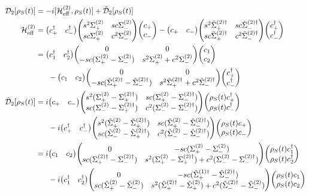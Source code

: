 \documentclass[dvipdfmx,autodetect-engine]{jsarticle}
\newcommand{\da}{\dagger}
\newcommand{\m}[1]{\mathcal{#1}}
\newcommand{\mr}[1]{\mathrm{#1}}
\begin{document}
\begin{align}
    \m{D}_2[\rho_S(t)] &= -i[\m{H}^{(2)}_{\mr{eff}}, \rho_S(t)] + \tilde{\m{D}}_2[\rho_S(t)]\\
    \m{H}^{(2)}_{\mr{eff}} &= \mqty(c^\da_+ & c^\da_-) \mqty(s^2 \Sigma^{(2)}_+ & sc \Sigma^{(2)}_- \\ sc \Sigma^{(2)}_+ & c^2 \Sigma^{(2)}_-)\mqty(c_+ \\ c_-) - \mqty(c_+ & c_-) \mqty(s^2 \tilde{\Sigma}^{(2)\da}_+ & sc \tilde{\Sigma}^{(2)\da}_- \\ sc \tilde{\Sigma}^{(2)\da}_+ & c^2 \tilde{\Sigma}^{(2)\da}_-)\mqty(c^\da_+ \\ c^\da_-)\nonumber\\
    &= \mqty(c^\da_1 & c^\da_2)\mqty(0 & 0\\ -sc(\Sigma^{(2)}_+-\Sigma^{(2)}_- ) & s^2 \Sigma^{(2)}_+ + c^2 \Sigma^{(2)}_- )\mqty(c_1 \\ c_2)\nonumber\\
    & \ \ \ \ \  - \mqty(c_1 & c_2)\mqty(0 & 0 \\ -sc( \tilde{\Sigma}^{(2)\da}_+- \tilde{\Sigma}^{(2)\da}_-) & s^2 \tilde{\Sigma}^{(2)\da}_++c^2 \tilde{\Sigma}^{(2)\da}_-)\mqty(c^\da_+ \\ c^\da_-)\\
    \tilde{\m{D}}_2[\rho_S(t)] &= i\mqty(c_+ & c_-) \mqty(s^2(\Sigma^{(2)}_+-\Sigma^{(2)\da}_+) & sc(\Sigma^{(2)}_+-\Sigma^{(2)\da}_-) \\ sc(\Sigma^{(2)}_--\Sigma^{(2)\da}_+) & c^2(\Sigma^{(2)}_--\Sigma^{(2)\da}_-))\mqty(\rho_S(t)c^\da_+ \\ \rho_S(t)c^\da_-)\nonumber\\
     & \ \ \ \ \ - i\mqty(c^\da_+ & c^\da_-) \mqty(s^2(\tilde{\Sigma}^{(2)}_+-\tilde{\Sigma}^{(2)\da}_+) & sc(\tilde{\Sigma}^{(2)}_+-\tilde{\Sigma}^{(2)\da}_-) \\ sc(\tilde{\Sigma}^{(2)}_--\tilde{\Sigma}^{(2)\da}_+) & c^2(\tilde{\Sigma}^{(2)}_--\tilde{\Sigma}^{(2)\da}_-))\mqty(\rho_S(t)c_+ \\ \rho_S(t)c_-)\\
     & = i\mqty(c_1 & c_2) \mqty(0 & -sc(\Sigma^{(2)}_+-\Sigma^{(2)}_-) \\ sc(\Sigma^{(2)\da}_+-\Sigma^{(2)\da}_-) & s^2(\Sigma^{(2)}_+-\Sigma^{(2)\da}_+) +c^2(\Sigma^{(2)}_--\Sigma^{(2)\da}_-))\mqty(\rho_S(t)c^\da_1 \\ \rho_S(t)c^\da_2)\nonumber\\
     & \ \ \ \ \ - i\mqty(c^\da_1 & c^\da_2) \mqty(0 & -sc(\tilde{\Sigma}^{(1)\da}_+-\tilde{\Sigma}^{(2)\da}_-) \\ sc(\tilde{\Sigma}^{(2)}_+-\tilde{\Sigma}^{(2)}_-) & s^2(\tilde{\Sigma}^{(2)\da}_+-\tilde{\Sigma}^{(2)}_+) +c^2(\tilde{\Sigma}^{(2)\da}_--\tilde{\Sigma}^{(2)}_-))\mqty(\rho_S(t)c_1 \\ \rho_S(t)c_2)
\end{align}
\end{document}
